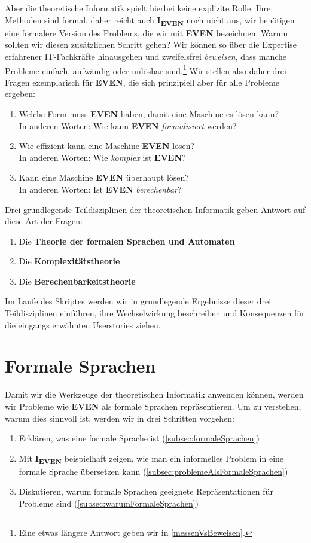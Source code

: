 Aber die theoretische Informatik spielt hierbei keine explizite Rolle.
Ihre Methoden sind formal,
daher reicht auch \textbf{I\textsubscript{EVEN}} noch nicht aus,
wir benötigen eine formalere Version des Problems,
die wir mit \textbf{EVEN} bezeichnen.
Warum sollten wir diesen zusätzlichen Schritt gehen?
Wir können so über die Expertise erfahrener IT-Fachkräfte hinausgehen
und zweifelsfrei \emph{beweisen},
dass manche Probleme einfach, aufwändig oder unlösbar sind.\footnote{
    Eine etwas längere Antwort geben wir in \autoref{messenVsBeweisen}.
}
Wir stellen also daher drei Fragen exemplarisch für \textbf{EVEN},
die sich prinzipiell aber für alle Probleme ergeben:
\begin{enumerate}
    \item Welche Form muss \textbf{EVEN} haben, damit eine Maschine es lösen kann?\\
        In anderen Worten: Wie kann \textbf{EVEN} \emph{formalisiert} werden?
    \item Wie effizient kann eine Maschine \textbf{EVEN} lösen?\\
        In anderen Worten: Wie \emph{komplex} ist \textbf{EVEN}?
    \item Kann eine Maschine \textbf{EVEN} überhaupt lösen?\\
        In anderen Worten: Ist \textbf{EVEN} \emph{berechenbar}?
\end{enumerate}
Drei grundlegende Teildisziplinen der theoretischen Informatik
geben Antwort auf diese Art der Fragen:
\begin{enumerate}
    \item Die \textbf{Theorie der formalen Sprachen und Automaten}
    \item Die \textbf{Komplexitätstheorie}
    \item Die \textbf{Berechenbarkeitstheorie}
\end{enumerate}
Im Laufe des Skriptes werden wir
in grundlegende Ergebnisse dieser drei Teildisziplinen einführen,
ihre Wechselwirkung beschreiben
und Konsequenzen für die eingangs erwähnten Userstories ziehen.

\section{Formale Sprachen}\label{sec:formalisierung}

Damit wir die Werkzeuge der theoretischen Informatik anwenden können,
werden wir Probleme wie \textbf{EVEN} als formale Sprachen repräsentieren.
Um zu verstehen, warum dies sinnvoll ist,
werden wir in drei Schritten vorgehen:
\begin{enumerate}
    \item Erklären, was eine formale Sprache ist (\autoref{subsec:formaleSprachen})
    \item Mit \textbf{I\textsubscript{EVEN}} beispielhaft zeigen,
        wie man ein informelles Problem in eine formale Sprache übersetzen kann
        (\autoref{subsec:problemeAlsFormaleSprachen})
    \item Diskutieren, warum formale Sprachen geeignete Repräsentationen für Probleme sind
        (\autoref{subsec:warumFormaleSprachen})
\end{enumerate}

